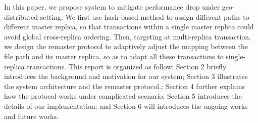 In this paper, we propose \name{} system to mitigate performance drop under geo-distributed setting. We first use hash-based method to assign different paths to different master replica, so that transactions within a single master replica could avoid global cross-replica ordering. Then, targeting at multi-replica transaction, we design the remaster protocol to adaptively adjust the mapping between the file path and its master replica, so as to adapt all these transactions to single-replica transactions. This report is organized as follow: Section 2 briefly introduces the background and motivation for our system; Section 3 illustrates the system architecture and the remaster protocol.; Section 4 further explains how the protocol works under complicated scenario; Section 5 introduces the details of our implementation; and Section 6 will introduces the ongoing works and future works.

